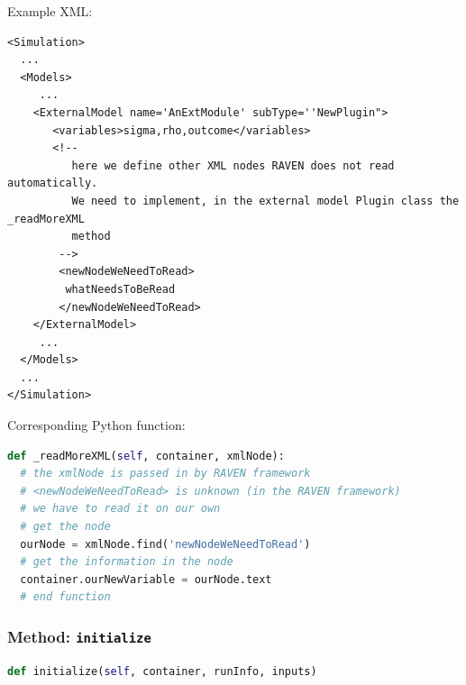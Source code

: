 Example XML:
\begin{lstlisting}[style=XML,morekeywords={subType,ModuleToLoad}]
<Simulation>
  ...
  <Models>
     ...
    <ExternalModel name='AnExtModule' subType=''NewPlugin">
       <variables>sigma,rho,outcome</variables>
       <!--
          here we define other XML nodes RAVEN does not read automatically.
          We need to implement, in the external model Plugin class the _readMoreXML
          method
        -->
        <newNodeWeNeedToRead>
         whatNeedsToBeRead
        </newNodeWeNeedToRead>
    </ExternalModel>
     ...
  </Models>
  ...
</Simulation>
\end{lstlisting}

Corresponding Python function:
\begin{lstlisting}[language=python]
def _readMoreXML(self, container, xmlNode):
  # the xmlNode is passed in by RAVEN framework
  # <newNodeWeNeedToRead> is unknown (in the RAVEN framework)
  # we have to read it on our own
  # get the node
  ourNode = xmlNode.find('newNodeWeNeedToRead')
  # get the information in the node
  container.ourNewVariable = ourNode.text
  # end function
\end{lstlisting}

\subsubsection{Method: \texttt{initialize}}
\label{subsubsec:externalInitializeExternalModelPlugin}
\begin{lstlisting}[language=python]
def initialize(self, container, runInfo, inputs)
\end{lstlisting}

